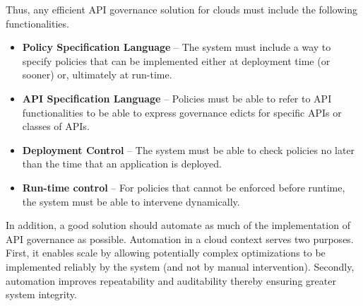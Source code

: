 Thus, any efficient API governance solution for clouds must include the
following functionalities.
\begin{itemize}
\item {\bf Policy Specification Language} -- The system must include a way to
specify policies that can be implemented either at deployment time (or sooner)
or, ultimately at run-time.  
\item {\bf API Specification Language} -- Policies must be able to refer to
API functionalities to be able to express governance edicts for specific APIs
or classes of APIs.
\item {\bf Deployment Control} --  The system must be able to check policies
no later than the time that an application is deployed.
\item {\bf Run-time control} -- For policies that cannot be enforced before
runtime, the system must be able to intervene dynamically.
\end{itemize}
In addition, a good solution should automate 
as much of the implementation
of API governance as possible.  Automation in a cloud context serves two
purposes.  First, it enables scale by allowing potentially complex
optimizations to be implemented reliably by the system (and not by manual
intervention).  Secondly, automation improves repeatability and auditability
thereby ensuring greater system integrity.
